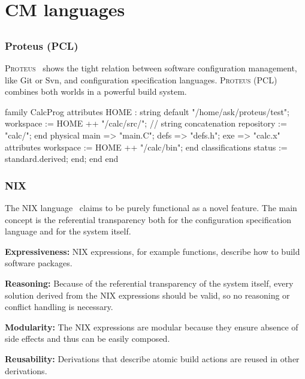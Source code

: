\section{CM languages}

\subsection{}

\begin{frame}[fragile]
	\frametitle{Proteus (PCL)}
	\textsc{Proteus}~\cite{tryggeseth1995modelling} shows the tight relation between software configuration management, like Git or Svn, and configuration specification languages.
	\textsc{Proteus} (PCL) combines both worlds in a powerful build system.

	\begin{code}[basicstyle=\tiny,morekeywords={family,attributes,end,physical,default,classifications},gobble=4,language=]
	family CalcProg
		attributes
			HOME : string default "/home/ask/proteus/test";
			workspace := HOME ++ "/calc/src/"; // string concatenation
			repository := "calc/";
			end
		physical
			main => "main.C";
			defs => "defs.h";
			exe => "calc.x" attributes workspace := HOME ++ "/calc/bin"; end
			classifications status := standard.derived; end;
		end
	end
	\end{code}
\end{frame}

\begin{frame}
	\frametitle{NIX}

	The NIX language~\cite{dolstra2007purely} claims to be purely functional as a novel feature.
	The main concept is the referential transparency both for the configuration specification language and for the system itself.

	\textbf{Expressiveness:}
	NIX expressions, for example functions, describe how to build software packages.

	\textbf{Reasoning:}
	Because of the referential transparency of the system itself, every solution derived from the NIX expressions should be valid, so no reasoning or conflict handling is necessary.

	\textbf{Modularity:}
	The NIX expressions are modular because they ensure absence of side effects and thus can be easily composed.

	\textbf{Reusability:}
	Derivations that describe atomic build actions are reused in other derivations.
\end{frame}

